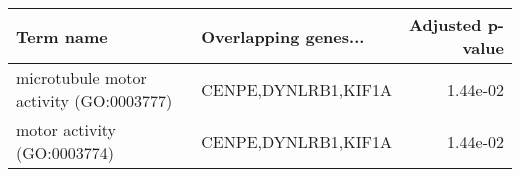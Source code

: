 \begin{tabular}{llr}
\toprule
                              Term name & Overlapping genes... &  Adjusted p-value \\
\midrule
microtubule motor activity (GO:0003777) &  CENPE,DYNLRB1,KIF1A &          1.44e-02 \\
            motor activity (GO:0003774) &  CENPE,DYNLRB1,KIF1A &          1.44e-02 \\
\bottomrule
\end{tabular}
